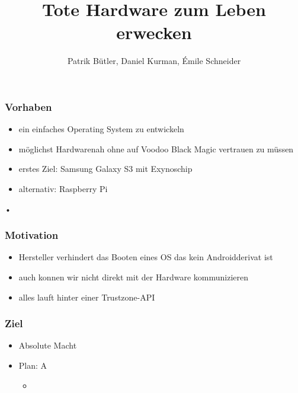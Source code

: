 \documentclass[11pt]{beamer}
\author{Patrik Bütler, Daniel Kurman, Émile Schneider}
\title{Tote Hardware zum Leben erwecken}
\begin{document}
\begin{frame}
\titlepage
\end{frame}

\begin{frame}
\frametitle{Vorhaben}

\begin{itemize}
 \item<1-> ein einfaches Operating System zu entwickeln
 \item<2-> möglichst Hardwarenah ohne auf Voodoo Black Magic vertrauen zu müssen
\item<3-> erstes Ziel: Samsung Galaxy S3 mit Exynoschip
\item<4-> alternativ: Raspberry Pi
\end{itemize}
\end{frame}



\begin{frame}{•}
\frametitle{Motivation}
\begin{itemize}
\item<1-> Hersteller verhindert das Booten eines OS das kein Androidderivat ist
\item<2-> auch konnen wir nicht direkt mit der Hardware kommunizieren
\item<3-> alles lauft hinter einer Trustzone-API
\end{itemize}
\end{frame}
\begin{frame}
\frametitle{Ziel}
\begin{itemize}
\item<1-> Absolute Macht
\item<2-> Plan: A
	\begin{itemize}
	\item<3->
	\end{itemize}
\end{itemize}

\end{frame}
\end{document}
